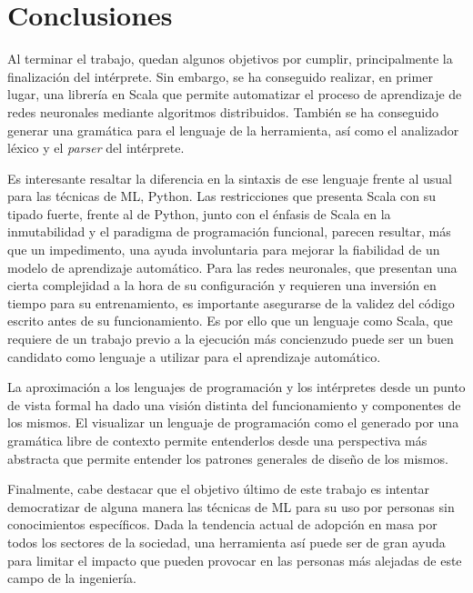 
\chapter{Conclusiones}

Al terminar el trabajo, quedan algunos objetivos por cumplir, principalmente la finalización del intérprete. Sin embargo,
se ha conseguido realizar, en primer lugar, una librería en Scala que permite automatizar el proceso de aprendizaje de
redes neuronales mediante algoritmos distribuidos. También se ha conseguido generar una gramática para el lenguaje de la
herramienta, así como el analizador léxico y el \textit{parser} del intérprete.

\vspace{10pt}
Es interesante resaltar la diferencia en la sintaxis de ese lenguaje frente al usual para las técnicas de ML, Python.
Las restricciones que presenta Scala con su tipado fuerte, frente al de Python, junto con el énfasis de Scala en la
inmutabilidad y el paradigma de programación funcional, parecen resultar, más que un impedimento, una ayuda involuntaria
para mejorar la fiabilidad de un modelo de aprendizaje automático. Para las redes neuronales, que presentan una cierta
complejidad a la hora de su configuración y requieren una inversión en tiempo para su entrenamiento, es importante
asegurarse de la validez del código escrito antes de su funcionamiento. Es por ello que un lenguaje como Scala, que
requiere de un trabajo previo a la ejecución más concienzudo puede ser un buen candidato como lenguaje a utilizar para
el aprendizaje automático.

\vspace{10pt}
La aproximación a los lenguajes de programación y los intérpretes desde un punto de vista formal ha dado una visión distinta
del funcionamiento y componentes de los mismos. El visualizar un lenguaje de programación como el generado por una gramática
libre de contexto permite entenderlos desde una perspectiva más abstracta que permite entender los patrones generales de
diseño de los mismos.

\vspace{10pt}
Finalmente, cabe destacar que el objetivo último de este trabajo es intentar democratizar de alguna manera las técnicas de
ML para su uso por personas sin conocimientos específicos. Dada la tendencia actual de adopción en masa por todos los
sectores de la sociedad, una herramienta así puede ser de gran ayuda para limitar el impacto que pueden provocar en las
personas más alejadas de este campo de la ingeniería.

